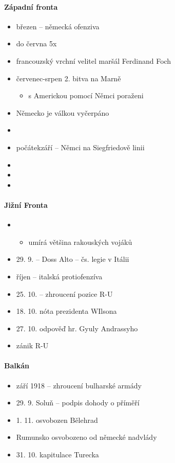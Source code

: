 \paragraph{Západní fronta}
\begin{itemize}
\item březen -- německá ofenziva
\item do června 5x
\item francouzský vrchní velitel maršál Ferdinand Foch
\item červenec-srpen 2. bitva na Marně 
	\begin{itemize}
	\item s Americkou pomocí Němci poraženi
	\end{itemize}
\item Německo je válkou vyčerpáno
\item {}
\item počátekzáří -- Němci na Siegfriedově linii
\item {}
\item {}
\item {}
\end{itemize}

\paragraph{Jižní Fronta}
\begin{itemize}
\item {}
	\begin{itemize}
	\item umírá většina rakouských vojáků
	\end{itemize}
\item 29. 9. -- Doss Alto -- čs. legie v Itálii
\item říjen -- italská protiofenzíva
\item 25. 10. -- zhroucení pozice R-U
\item 18. 10. nóta prezidenta WIlsona
\item 27. 10. odpověď hr. Gyuly Andrassyho 
\item zánik R-U
\end{itemize}

\paragraph{Balkán}
\begin{itemize}
\item září 1918 -- zhroucení bulharské armády
\item 29. 9. Soluň -- podpis dohody o příměří
\item 1. 11. osvobozen Bělehrad
\item Rumunsko osvobozeno od německé nadvlády
\item 31. 10. kapitulace Turecka
\end{itemize}

